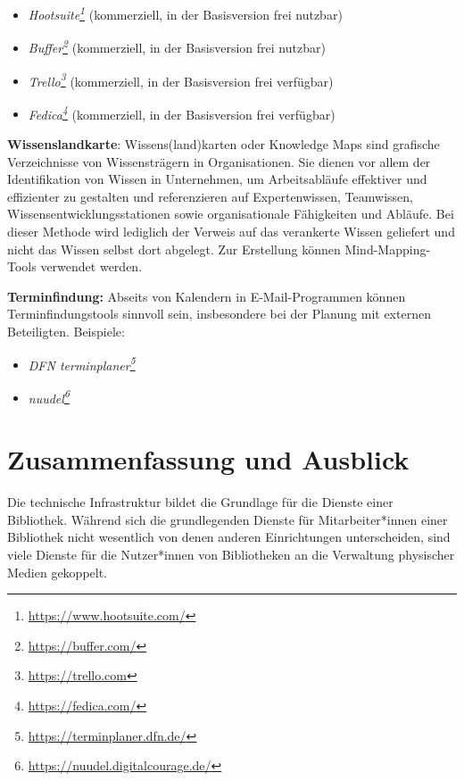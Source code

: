 \documentclass[
  11pt,
  letterpaper,
  DIV=11,
  twoside]{scrreprt}
\providecommand{\tightlist}{%
  \setlength{\itemsep}{0pt}\setlength{\parskip}{0pt}}\usepackage{longtable,booktabs,array}
\DeclareRobustCommand{\href}[2]{#2\footnote{\url{#1}}}
\begin{document}
\begin{itemize}
\tightlist
\item
  \emph{\href{https://www.hootsuite.com/}{Hootsuite}} (kommerziell, in
  der Basisversion frei nutzbar)
\item
  \emph{\href{https://buffer.com/}{Buffer}} (kommerziell, in der
  Basisversion frei nutzbar)
\item
  \emph{\href{https://trello.com}{Trello}} (kommerziell, in der
  Basisversion frei verfügbar)
\item
  \emph{\href{https://fedica.com/}{Fedica}} (kommerziell, in der
  Basisversion frei verfügbar)
\end{itemize}

\textbf{Wissenslandkarte}: Wissens(land)karten oder Knowledge Maps sind
grafische Verzeichnisse von Wissensträgern in Organisationen. Sie dienen
vor allem der Identifikation von Wissen in Unternehmen, um
Arbeitsabläufe effektiver und effizienter zu gestalten und referenzieren
auf Expertenwissen, Teamwissen, Wissensentwicklungsstationen sowie
organisationale Fähigkeiten und Abläufe. Bei dieser Methode wird
lediglich der Verweis auf das verankerte Wissen geliefert und nicht das
Wissen selbst dort abgelegt. Zur Erstellung können Mind-Mapping-Tools
verwendet werden.

\textbf{Terminfindung:} Abseits von Kalendern in E-Mail-Programmen
können Terminfindungstools sinnvoll sein, insbesondere bei der Planung
mit externen Beteiligten. Beispiele:

\begin{itemize}
\tightlist
\item
  \emph{\href{https://terminplaner.dfn.de/}{DFN terminplaner}}
\item
  \emph{\href{https://nuudel.digitalcourage.de/}{nuudel}}
\end{itemize}

\section{Zusammenfassung und
Ausblick}\label{zusammenfassung-und-ausblick}

Die technische Infrastruktur bildet die Grundlage für die Dienste einer
Bibliothek. Während sich die grundlegenden Dienste für Mitarbeiter*innen
einer Bibliothek nicht wesentlich von denen anderen Einrichtungen
unterscheiden, sind viele Dienste für die Nutzer*innen von Bibliotheken
an die Verwaltung physischer Medien gekoppelt.

\end{document}

